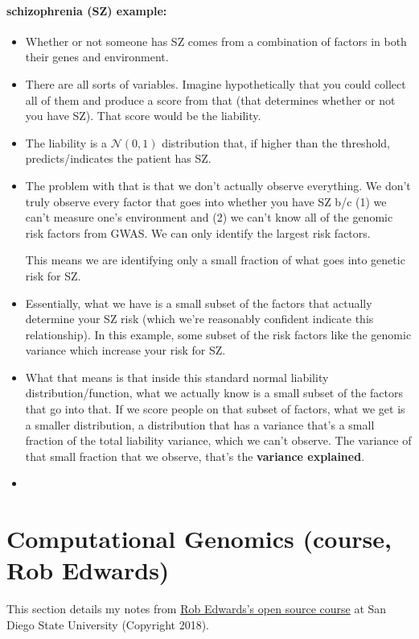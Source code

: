 \paragraph*{schizophrenia (SZ) example:}
\begin{itemize}
\item
	Whether or not someone has SZ comes from a combination of factors in both their genes and environment.
\item
	There are all sorts of variables. Imagine hypothetically that you could collect all of them and produce a score from that (that determines whether or not you have SZ). That score would be the liability.
\item
	The liability is a $\mathcal{N}(0,1)$ distribution that, if higher than the threshold, predicts/indicates the patient has SZ.
\item
	The problem with that is that we don't actually observe everything. We don't truly observe every factor that goes into whether you have SZ b/c (1) we can't measure one's environment and (2) we can't know all of the genomic risk factors from GWAS. We can only identify the largest risk factors.

	This means we are identifying only a small fraction of what goes into genetic risk for SZ.
\item
	Essentially, what we have is a small subset of the factors that actually determine your SZ risk (which we're reasonably confident indicate this relationship). In this example, some subset of the risk factors  like the genomic variance which increase your risk for SZ.
\item
	What that means is that inside this standard normal liability distribution/function, what we actually know is a small subset of the factors that go into that. If we score people on that subset of factors, what we get is a smaller distribution, a distribution that has a variance that's a small fraction of the total liability variance, which we can't observe. The variance of that small fraction that we observe, that's the \textbf{variance explained}.
\item

\end{itemize}

\section{Computational Genomics (course, Rob Edwards)}

This section details my notes from \href{https://www.youtube.com/watch?v=WuoHFKm4vXo\&list=PLpPXw4zFa0uLMHwSZ7DMeLGjIUgo1IBbn\&index=1}{Rob Edwards's open source course} at San Diego State University (Copyright 2018).


